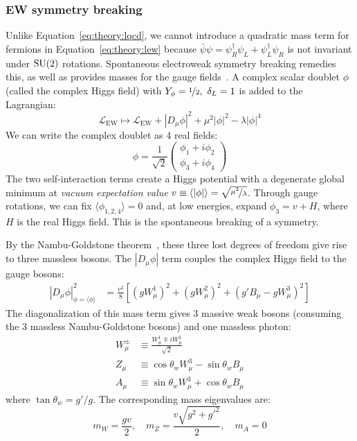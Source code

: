 \subsubsection{EW symmetry breaking}
Unlike Equation~\ref{eq:theory:lqcd}, we cannot introduce a quadratic mass term for fermions in Equation~\ref{eq:theory:lew} because ${\bar\psi \psi = \psi^\dag_R\psi_L + \psi^\dag_L\psi_R}$ is not invariant under ${\operatorname{\mathrm{SU}}(2)}$ rotations.
Spontaneous electroweak symmetry breaking remedies this, as well as provides masses for the gauge fields~\cite{ewsb1,ewsb2,ewsb3,ewsb4,ewsb5,ewsb6}.
A complex scalar doublet ${\phi}$ (called the complex Higgs field) with ${Y_\phi=\nicefrac{1}{2},~\delta_L=1}$ is added to the Lagrangian:
\begin{equation}
    \mathcal{L}_\mathrm{EW} \mapsto \mathcal{L}_\mathrm{EW}
            + |D_\mu \phi|^2 + \mu^2|\phi|^2 - \lambda |\phi|^4
    \label{eq:theory:lhiggs}
\end{equation}
We can write the complex doublet as 4 real fields:
\begin{equation}
    \phi = \frac{1}{\sqrt{2}} \left(\begin{matrix} \phi_1 + i\phi_2 \\ \phi_3 + i \phi_4 \end{matrix} \right)
\end{equation}
The two self-interaction terms create a Higgs potential with a degenerate global minimum at \emph{vacuum expectation value} ${v \equiv \langle |\phi| \rangle = \sqrt{\nicefrac{\mu^2}{\lambda}}}$.
Through gauge rotations, we can fix ${\langle\phi_{1,2,4}\rangle = 0}$ and, at low energies, expand ${\phi_3 = v + H}$, where ${H}$ is the real Higgs field. 
This is the spontaneous breaking of a symmetry.

By the Nambu-Goldstone theorem~\cite{nambu,goldstone}, these three lost degrees of freedom give rise to three massless bosons. 
The ${|D_\mu \phi|}$ term couples the complex Higgs field to the gauge bosons:
\begin{align}
    |D_\mu \phi|^2_{\phi = \langle\phi\rangle} &= 
        \frac{v^2}{8} \left[(gW_\mu^1)^2 + (gW^2_\mu)^2 + (g'B_\mu - gW_\mu^3)^2\right] 
\end{align}
The diagonalization of this mass term gives 3 massive weak bosons (consuming the 3 massless Nambu-Goldstone bosons) and one massless photon:
\begin{align}
    W^\pm_\mu &\equiv \frac{W_\mu^1 \mp iW_\mu^2}{\sqrt{2}} \nonumber \\ 
    Z_\mu &\equiv \cos\theta_w W_\mu^3 - \sin\theta_w B_\mu \nonumber \\ 
    A_\mu &\equiv \sin\theta_w W_\mu^3 + \cos\theta_w B_\mu
\end{align}
where ${\tan\theta_w = g'/g}$.
The corresponding mass eigenvalues are:
\begin{equation}
    m_W = \frac{gv}{2}, \quad m_Z = \frac{v\sqrt{g^2+g'^2}}{2}, \quad m_A = 0
\end{equation}

